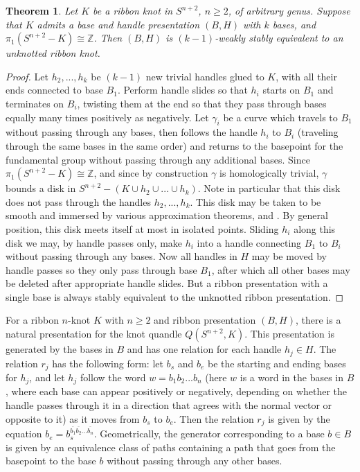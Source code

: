 \documentclass{amsart}
\newtheorem{theorem}{Theorem}
\newcommand{\bpr}{\begin{proof}}
\newcommand{\epr}{\end{proof}}
\begin{document}
\begin{theorem}
Let $K$ be a ribbon knot in $S^{n+2}$, $n\geq 2$, of arbitrary genus. Suppose that $K$ admits a base and handle presentation $(B, H)$ with $k$ bases, and $\pi_{1}(S^{n+2}-K)\cong \mathbb{Z}$. Then $(B, H)$ is $(k-1)$-weakly stably equivalent to an unknotted ribbon knot.
\end{theorem}
\bpr Let $h_{2},..., h_{k}$ be $(k-1)$ new trivial handles glued to $K$, with all their ends connected to base $B_{1}$. Perform handle slides so that $h_{i}$ starts on $B_{1}$ and terminates on $B_{i}$, twisting them at the end so that they pass through bases equally many times positively as negatively. Let $\gamma_{i}$ be a curve which travels to $B_{1}$ without passing through any bases, then follows the handle $h_{i}$ to $B_{i}$ (traveling through the same bases in the same order) and returns to the basepoint for the fundamental group without passing through any additional bases. Since $\pi_{1}(S^{n+2}-K)\cong \mathbb{Z}$, and since by construction $\gamma$ is homologically trivial, $\gamma$ bounds a disk in $S^{n+2}-(K\cup h_{2}\cup ... \cup h_{k})$. Note in particular that this disk does not pass through the handles $h_2, ..., h_k$. This disk may be taken to be smooth and immersed by various approximation theorems, \cite[Theorem 10.16, Theorem 10.21]{Lee} and \cite[Theorem 2.5]{Adachi}. By general position, this disk meets itself at most in isolated points. Sliding $h_{i}$ along this disk we may, by handle passes only, make $h_{i}$ into a handle connecting $B_{1}$ to $B_{i}$ without passing through any bases. Now all handles in $H$ may be moved by handle passes so they only pass through base $B_{1}$, after which all other bases may be deleted after appropriate handle slides. But a ribbon presentation with a single base is always stably equivalent to the unknotted ribbon presentation. \epr

For a ribbon $n$-knot $K$ with $n\geq 2$ and ribbon presentation $(B, H)$, there is a natural presentation for the knot quandle $Q(S^{n+2}, K)$. This presentation is generated by the bases in $B$ and has one relation for each handle $h_{j}\in H$. The relation $r_{j}$ has the following form: let $b_s$ and $b_e$ be the starting and ending bases for $h_j$, and let $h_j$ follow the word $w=b_1 b_2... b_n$ (here $w$ is a word in the bases in $B$, where each base can appear positively or negatively, depending on whether the handle passes through it in a direction that agrees with the normal vector or opposite to it) as it moves from $b_s$ to $b_e$. Then the relation $r_j$ is given by the equation $b_e=b_s^{\overline{b_1}\overline{b_2}...\overline{b_n}}$. Geometrically, the generator corresponding to a base $b\in B$ is given by an equivalence class of paths containing a path that goes from the basepoint to the base $b$ without passing through any other bases.
\end{document}
